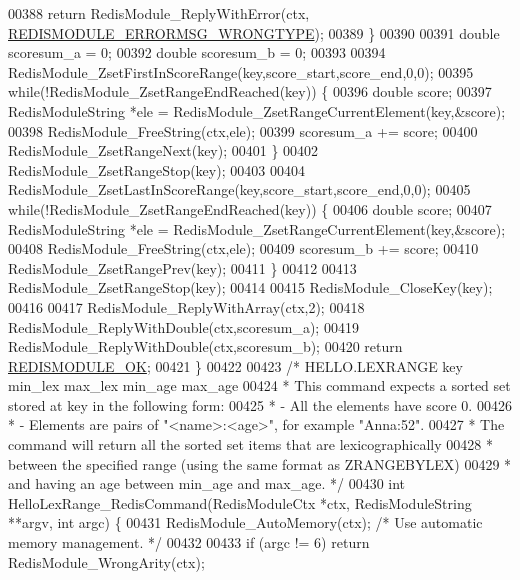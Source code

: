 \begin{DoxyCode}
00388         \textcolor{keywordflow}{return} RedisModule\_ReplyWithError(ctx,
      \hyperlink{redismodule_8h_ab897689b0673a1e4cbc097cb5bce04c1}{REDISMODULE\_ERRORMSG\_WRONGTYPE});
00389     \}
00390 
00391     \textcolor{keywordtype}{double} scoresum\_a = 0;
00392     \textcolor{keywordtype}{double} scoresum\_b = 0;
00393 
00394     RedisModule\_ZsetFirstInScoreRange(key,score\_start,score\_end,0,0);
00395     \textcolor{keywordflow}{while}(!RedisModule\_ZsetRangeEndReached(key)) \{
00396         \textcolor{keywordtype}{double} score;
00397         RedisModuleString *ele = RedisModule\_ZsetRangeCurrentElement(key,&score);
00398         RedisModule\_FreeString(ctx,ele);
00399         scoresum\_a += score;
00400         RedisModule\_ZsetRangeNext(key);
00401     \}
00402     RedisModule\_ZsetRangeStop(key);
00403 
00404     RedisModule\_ZsetLastInScoreRange(key,score\_start,score\_end,0,0);
00405     \textcolor{keywordflow}{while}(!RedisModule\_ZsetRangeEndReached(key)) \{
00406         \textcolor{keywordtype}{double} score;
00407         RedisModuleString *ele = RedisModule\_ZsetRangeCurrentElement(key,&score);
00408         RedisModule\_FreeString(ctx,ele);
00409         scoresum\_b += score;
00410         RedisModule\_ZsetRangePrev(key);
00411     \}
00412 
00413     RedisModule\_ZsetRangeStop(key);
00414 
00415     RedisModule\_CloseKey(key);
00416 
00417     RedisModule\_ReplyWithArray(ctx,2);
00418     RedisModule\_ReplyWithDouble(ctx,scoresum\_a);
00419     RedisModule\_ReplyWithDouble(ctx,scoresum\_b);
00420     \textcolor{keywordflow}{return} \hyperlink{redismodule_8h_a1bc5bfd69abcd378ff52c640adc5418d}{REDISMODULE\_OK};
00421 \}
00422 
00423 \textcolor{comment}{/* HELLO.LEXRANGE key min\_lex max\_lex min\_age max\_age}
00424 \textcolor{comment}{ * This command expects a sorted set stored at key in the following form:}
00425 \textcolor{comment}{ * - All the elements have score 0.}
00426 \textcolor{comment}{ * - Elements are pairs of "<name>:<age>", for example "Anna:52".}
00427 \textcolor{comment}{ * The command will return all the sorted set items that are lexicographically}
00428 \textcolor{comment}{ * between the specified range (using the same format as ZRANGEBYLEX)}
00429 \textcolor{comment}{ * and having an age between min\_age and max\_age. */}
00430 \textcolor{keywordtype}{int} HelloLexRange\_RedisCommand(RedisModuleCtx *ctx, RedisModuleString **argv, \textcolor{keywordtype}{int} argc) \{
00431     RedisModule\_AutoMemory(ctx); \textcolor{comment}{/* Use automatic memory management. */}
00432 
00433     \textcolor{keywordflow}{if} (argc != 6) \textcolor{keywordflow}{return} RedisModule\_WrongArity(ctx);

\end{DoxyCode}
